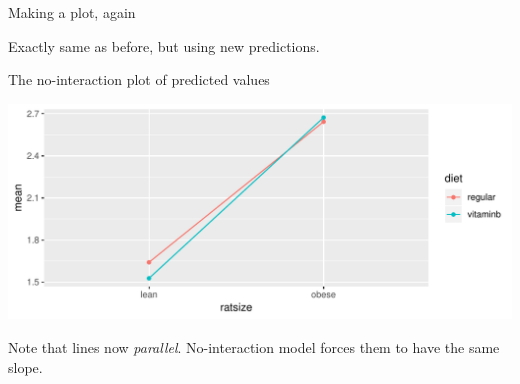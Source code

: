 \begin{frame}[fragile]{Making a plot, again}

 
\begin{knitrout}
\color{fgcolor}\begin{kframe}
\begin{alltt}
\hlkwb{=}
  \hlstd{(}\hlopt{+}
  \hlstd{()}\hlopt{+}
  \hlstd{(}\hlstd{(}
\end{alltt}
\end{kframe}
\end{knitrout}
 

Exactly same as before, but using new predictions.
  
\end{frame}

\begin{frame}{The no-interaction plot of predicted values}
  
 
\begin{knitrout}
\color{fgcolor}\begin{kframe}
\begin{alltt}
\end{alltt}
\end{kframe}
\includegraphics[width=\maxwidth]{figure/cabazzo-1} 

\end{knitrout}


Note that lines now \emph{parallel}. No-interaction model forces them
to have the same slope. 

\end{frame}

